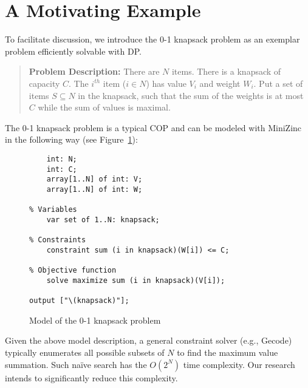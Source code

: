 \section{A Motivating Example}
	To facilitate discussion, we introduce the 0-1 knapsack problem as an exemplar problem efficiently solvable with DP. 
	
	
	\begin{quote}
		\textbf{Problem Description:} There are $N$ items. There is a knapsack of capacity $C$. The $i^{th}$ item ($i \in N$) has value $V_i$ and weight $W_i$. Put a set of items $S \subseteq N$ in the knapsack, such that the sum of the weights is at most $C$ while the sum of values is maximal.  
	\end{quote}
\noindent	
The 0-1 knapsack problem is a typical COP and can be modeled with MiniZinc in the following way (see Figure~\ref{fig:knapsack}): 
	
	
	\begin{figure}[htb]
\begin{lstlisting}[frame=single]
% Input arguments
    int: N;
    int: C;
    array[1..N] of int: V;
    array[1..N] of int: W;

% Variables
    var set of 1..N: knapsack;

% Constraints
    constraint sum (i in knapsack)(W[i]) <= C;

% Objective function
    solve maximize sum (i in knapsack)(V[i]);

output ["\(knapsack)"];
\end{lstlisting}
\caption{Model of the 0-1 knapsack problem}\label{fig:knapsack}
\end{figure}

\noindent    
Given the above model description, a general  constraint solver (e.g., Gecode) typically enumerates all possible subsets of $N$ to find the maximum value summation. Such na{\"i}ve search has the $O(2^N)$ time complexity. Our research intends to significantly reduce this complexity. %
    
 
